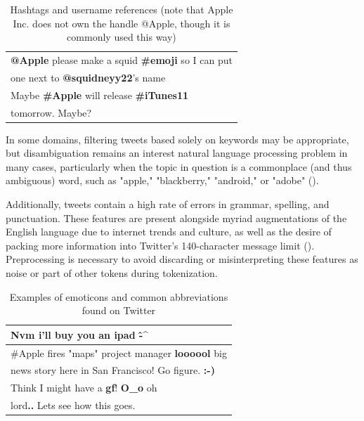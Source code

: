 \documentclass[letterpaper]{article}
\begin{document}
\begin{table}[h]
\centering
\begin{tabular}{|l|}
	\hline
\textbf{@Apple} please make a squid \textbf{\#emoji} so I can put \\
one next to \textbf{@squidneyy22}'s name\\ \hline
Maybe \textbf{\#Apple} will release \textbf{\#iTunes11} \\
tomorrow. Maybe? \\ \hline
\end{tabular}
\caption{Hashtags and username references (note that Apple Inc. does not own the handle @Apple, though it is commonly used this way)}
\label{tab:myfirsttable}
\end{table}

In some domains, filtering tweets based solely on keywords may be appropriate, but disambiguation remains an interest natural language processing problem in many cases, particularly when the topic in question is a commonplace (and thus ambiguous) word, such as "apple," "blackberry," "android," or "adobe" (\citeauthor{journals/ijcsa/YervaMA12}). 

Additionally, tweets contain a high rate of errors in grammar, spelling, and punctuation. These features are present alongside myriad augmentations of the English language due to internet trends and culture, as well as the desire of packing more information into Twitter's 140-character message limit (\citeauthor{Laboreiro:2010:TMM:1871840.1871853}). Preprocessing is necessary to avoid discarding or misinterpreting these features as noise or part of other tokens during tokenization.

\begin{table}[h]
\centering
\begin{tabular}{|l|}
	\hline
\textbf{Nvm} i'll buy you an ipad \textbf{\^-\^} \\ \hline
\#Apple fires "maps" project manager \textbf{loooool} big \\
 news story here in San Francisco! Go figure. \textbf{:-)} \\ \hline
Think I might have a \textbf{gf}! \textbf{O\_o} oh \\
lord\textbf{..} Lets see how this goes. \\ \hline
\end{tabular}
\caption{Examples of emoticons and common abbreviations found on Twitter}
\label{tab:myfirsttable}
\end{table}
\end{document}
